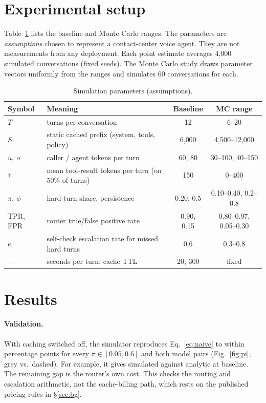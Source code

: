\documentclass[10pt]{article}
\begin{document}
\section{Experimental setup}
Table~\ref{tab:params} lists the baseline and Monte Carlo ranges. The parameters are \emph{assumptions} chosen to represent a contact-center voice agent. They are not measurements from any deployment. Each point estimate averages 4{,}000 simulated conversations (fixed seeds). The Monte Carlo study draws \mcN{} parameter vectors uniformly from the ranges and simulates 60 conversations for each.

\begin{table}[h]\centering\small
\caption{Simulation parameters (assumptions).}\label{tab:params}
\begin{tabular}{llcc}\toprule
Symbol & Meaning & Baseline & MC range\\\midrule
$T$ & turns per conversation & 12 & 6--20\\
$S$ & static cached prefix (system, tools, policy) & 6{,}000 & 4{,}500--12{,}000\\
$u,\ o$ & caller / agent tokens per turn & 60, 80 & 30--100, 40--150\\
$\bar\tau$ & mean tool-result tokens per turn (on 50\% of turns) & 150 & 0--400\\
$\pi,\ \phi$ & hard-turn share, persistence & 0.20, 0.5 & 0.10--0.40, 0.2--0.8\\
TPR, FPR & router true/false positive rate & 0.90, 0.15 & 0.80--0.97, 0.05--0.30\\
$e$ & self-check escalation rate for missed hard turns & 0.6 & 0.3--0.8\\
--- & seconds per turn; cache TTL & 20; 300 & fixed\\\bottomrule
\end{tabular}\end{table}

\section{Results}\label{sec:results}
\paragraph{Validation.} With caching switched off, the simulator reproduces Eq.~\eqref{eq:naive} to within \valGap{} percentage points for every $\pi\in[0.05,0.6]$ and both model pairs (Fig.~\ref{fig:pi}, grey vs.\ dashed). For example, it gives \hNoCache{} simulated against \hNaive{} analytic at baseline. The remaining gap is the router's own cost. This checks the routing and escalation arithmetic, not the cache-billing path, which rests on the published pricing rules in \S\ref{sec:bg}.
\end{document}
